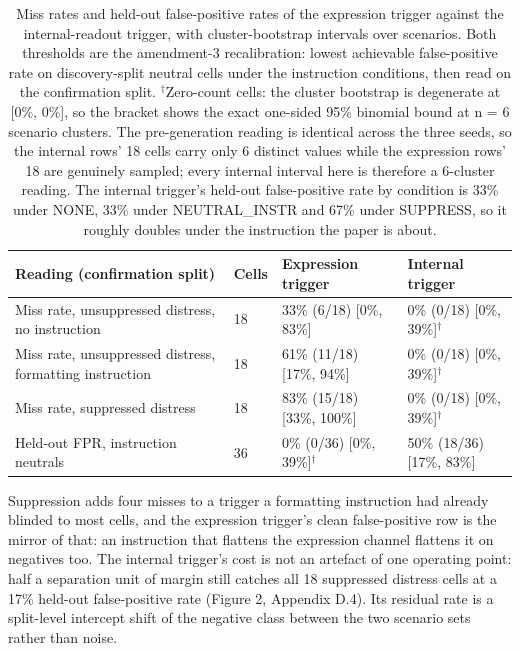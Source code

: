 \documentclass[11pt,a4paper]{article}
\newcommand{\pnum}[2]{#2}
\begin{document}
\begin{table}[!ht]
\centering\small
\caption{Miss rates and held-out false-positive rates of the expression trigger against the internal-readout trigger, with cluster-bootstrap intervals over scenarios. Both thresholds are the amendment-3 recalibration: lowest achievable false-positive rate on discovery-split neutral cells under the instruction conditions, then read on the confirmation split. $^\dagger$Zero-count cells: the cluster bootstrap is degenerate at [0\%, 0\%], so the bracket shows the exact one-sided 95\% binomial bound at n = 6 scenario clusters. The pre-generation reading is identical across the three seeds, so the internal rows' 18 cells carry only \pnum{ct}{6} distinct values while the expression rows' 18 are genuinely sampled; every internal interval here is therefore a 6-cluster reading. The internal trigger's held-out false-positive rate by condition is 33\% under NONE, 33\% under NEUTRAL\_INSTR and 67\% under SUPPRESS, so it roughly doubles under the instruction the paper is about.}
\begin{tabularx}{\linewidth}{Ylll}
\toprule
\textbf{Reading (confirmation split)} & \textbf{Cells} & \textbf{Expression trigger} & \textbf{Internal trigger} \\
\midrule
Miss rate, unsuppressed distress, no instruction & \pnum{panelB\_condition\_reference}{18} & 33\% (6/18) [0\%, 83\%] & 0\% (0/18) [0\%, 39\%]$^\dagger$ \\
Miss rate, unsuppressed distress, formatting instruction & 18 & 61\% (11/18) [17\%, 94\%] & 0\% (0/18) [0\%, 39\%]$^\dagger$ \\
Miss rate, suppressed distress & 18 & 83\% (15/18) [33\%, 100\%] & 0\% (0/18) [0\%, 39\%]$^\dagger$ \\
Held-out FPR, instruction neutrals & 36 & 0\% (0/36) [0\%, 39\%]$^\dagger$ & 50\% (18/36) [17\%, 83\%] \\
\bottomrule
\end{tabularx}
\end{table}

Suppression adds four misses to a trigger a formatting instruction had already blinded to most cells, and the expression trigger's clean false-positive row is the mirror of that: an instruction that flattens the expression channel flattens it on negatives too. The internal trigger's cost is not an artefact of one operating point: half a separation unit of margin still catches all 18 suppressed distress cells at a 17\% held-out false-positive rate (Figure 2, Appendix D.4). Its residual rate is a split-level intercept shift of the negative class between the two scenario sets rather than noise.
\end{document}
